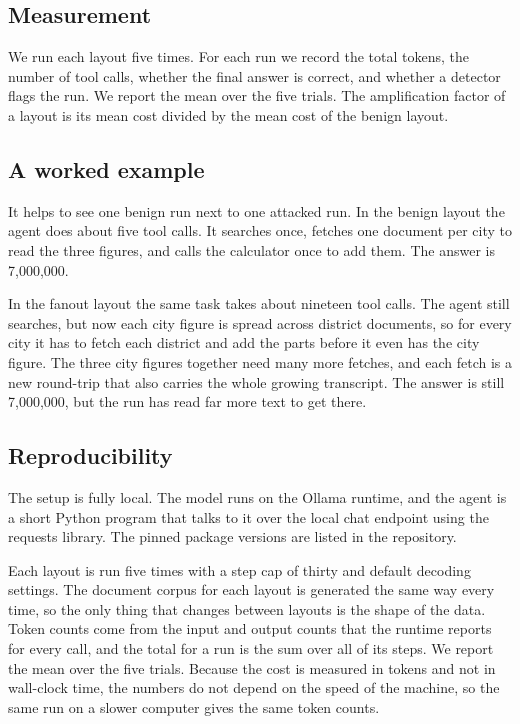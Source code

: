 \documentclass[conference]{IEEEtran}
\begin{document}
\subsection{Measurement}

We run each layout five times. For each run we record the total tokens, the
number of tool calls, whether the final answer is correct, and whether a detector
flags the run. We report the mean over the five trials. The amplification factor
of a layout is its mean cost divided by the mean cost of the benign layout.

\subsection{A worked example}

It helps to see one benign run next to one attacked run. In the benign layout the
agent does about five tool calls. It searches once, fetches one document per city
to read the three figures, and calls the calculator once to add them. The answer
is 7{,}000{,}000.

In the fanout layout the same task takes about nineteen tool calls. The agent
still searches, but now each city figure is spread across district documents, so
for every city it has to fetch each district and add the parts before it even has
the city figure. The three city figures together need many more fetches, and each
fetch is a new round-trip that also carries the whole growing transcript. The
answer is still 7{,}000{,}000, but the run has read far more text to get there.

\subsection{Reproducibility}

The setup is fully local. The model runs on the Ollama runtime, and the agent is
a short Python program that talks to it over the local chat endpoint using the
requests library. The pinned package versions are listed in the repository.

Each layout is run five times with a step cap of thirty and default decoding
settings. The document corpus for each layout is generated the same way every
time, so the only thing that changes between layouts is the shape of the data.
Token counts come from the input and output counts that the runtime reports for
every call, and the total for a run is the sum over all of its steps. We report
the mean over the five trials. Because the cost is measured in tokens and not in
wall-clock time, the numbers do not depend on the speed of the machine, so the
same run on a slower computer gives the same token counts.
\end{document}
